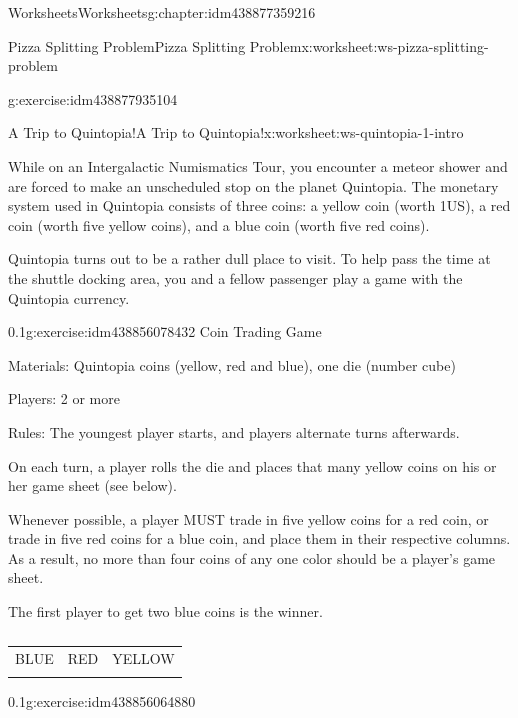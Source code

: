\documentclass[twoside,11pt,]{book}
\begin{document}
\begin{chapterptx}{Worksheets}{}{Worksheets}{}{}{g:chapter:idm438877359216}
\begin{worksheet-section-numberless}{Pizza Splitting Problem}{}{Pizza Splitting Problem}{}{}{x:worksheet:ws-pizza-splitting-problem}
\begin{divisionexercise}{7}{}{}{g:exercise:idm438877935104}
\end{divisionexercise}%
\end{worksheet-section-numberless}
\restoregeometry
%
%
\typeout{************************************************}
\typeout{************************************************}
%
\begin{worksheet-section-numberless}{A Trip to Quintopia!}{}{A Trip to Quintopia!}{}{}{x:worksheet:ws-quintopia-1-intro}
\begin{introduction}{}%
While on an Intergalactic Numismatics Tour, you encounter a meteor shower and are forced to make an unscheduled stop on the planet Quintopia.  The monetary system used in Quintopia consists of three coins:  a yellow coin (worth \textdollar{}1US), a red coin (worth five yellow coins), and a blue coin (worth five red coins).%
\par
Quintopia turns out to be a rather dull place to visit.  To help pass the time at the shuttle docking area, you and a fellow passenger play a game with the Quintopia currency.%
\end{introduction}%
\begin{divisionexercise}{1}{}{0.1}{g:exercise:idm438856078432}%
Coin Trading Game%
\par
Materials:  Quintopia coins (yellow, red and blue), one die (number cube)%
\par
Players:  2 or more%
\par
Rules:  The youngest player starts, and players alternate turns afterwards.%
\par
On each turn, a player rolls the die and places that many yellow coins on his or her game sheet (see below).%
\par
Whenever possible, a player MUST trade in five yellow coins for a red coin, or trade in five red coins for a blue coin, and place them in their respective columns.  As a result, no more than four coins of any one color should be a player’s game sheet.%
\par
The first player to get two blue coins is the winner.%
\begin{table}
\centering
\begin{tabular}{lll}
BLUE&RED&YELLOW\tabularnewline[0pt]
&&
\end{tabular}
\caption{\label{g:table:idm438856071056}}
\end{table}
\end{divisionexercise}%
\clearpage
\begin{divisionexercise}{2}{}{0.1}{g:exercise:idm438856064880}%

\end{divisionexercise}
\end{worksheet-section-numberless}
\end{chapterptx}
\end{document}
